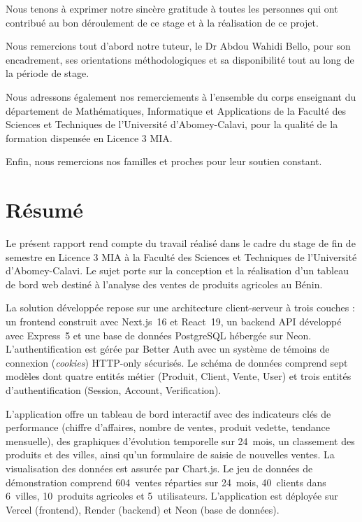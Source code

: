 \documentclass[11pt,a4paper]{report}
\begin{document}
Nous tenons à exprimer notre sincère gratitude à toutes les personnes qui ont
contribué au bon déroulement de ce stage et à la réalisation de ce projet.

Nous remercions tout d'abord notre tuteur, le Dr Abdou Wahidi Bello, pour son
encadrement, ses orientations méthodologiques et sa disponibilité tout au long
de la période de stage.

Nous adressons également nos remerciements à l'ensemble du corps enseignant du
département de Mathématiques, Informatique et Applications de la Faculté des
Sciences et Techniques de l'Université d'Abomey-Calavi, pour la qualité de la
formation dispensée en Licence 3 MIA.

Enfin, nous remercions nos familles et proches pour leur soutien constant.

\chapter*{Résumé}

Le présent rapport rend compte du travail réalisé dans le cadre du stage de fin
de semestre en Licence 3 MIA à la Faculté des Sciences et Techniques de
l'Université d'Abomey-Calavi. Le sujet porte sur la conception et la réalisation
d'un tableau de bord web destiné à l'analyse des ventes de produits agricoles au
Bénin.

La solution développée repose sur une architecture client-serveur à trois
couches : un frontend construit avec Next.js~16 et React~19, un backend API
développé avec Express~5 et une base de données PostgreSQL hébergée sur Neon.
L'authentification est gérée par Better Auth avec un système de témoins de
connexion (\emph{cookies}) HTTP-only sécurisés. Le schéma de données comprend
sept modèles dont quatre entités métier (Produit, Client, Vente, User) et trois
entités d'authentification (Session, Account, Verification).

L'application offre un tableau de bord interactif avec des indicateurs clés de
performance (chiffre d'affaires, nombre de ventes, produit vedette, tendance
mensuelle), des graphiques d'évolution temporelle sur 24~mois, un classement des
produits et des villes, ainsi qu'un formulaire de saisie de nouvelles ventes. La
visualisation des données est assurée par Chart.js. Le jeu de données de
démonstration comprend 604~ventes réparties sur 24~mois, 40~clients dans
6~villes, 10~produits agricoles et 5~utilisateurs. L'application est déployée sur
Vercel (frontend), Render (backend) et Neon (base de données).
\end{document}
